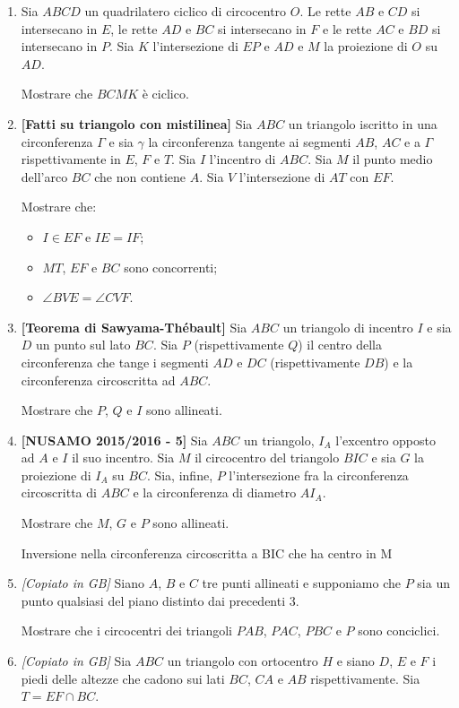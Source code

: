 \begin{enumerate}
	\item Sia $ABCD$ un quadrilatero ciclico di circocentro $O$. Le rette $AB$ e $CD$ si intersecano in $E$, le rette $AD$ e $BC$ si intersecano in $F$ e le rette $AC$ e $BD$ si intersecano in $P$. Sia $K$ l'intersezione di $EP$ e $AD$ e $M$ la proiezione di $O$ su $AD$.
	
	Mostrare che $BCMK$ è ciclico. 
	\item \textbf{[Fatti su triangolo con mistilinea]} Sia $ABC$ un triangolo iscritto in una circonferenza $\Gamma$ e sia $\gamma$ la circonferenza tangente ai segmenti $AB$, $AC$ e a $\Gamma$ rispettivamente in $E$, $F$ e $T$. Sia $I$ l'incentro di $ABC$. Sia $M$ il punto medio dell'arco $BC$ che non contiene $A$. Sia $V$ l'intersezione di $AT$ con $EF$. 
	
	Mostrare che:
	\begin{itemize}
		\item $I\in EF$ e $IE=IF$;
		\item $MT$, $EF$ e $BC$ sono concorrenti;
		\item $\angle BVE=\angle CVF$.
	\end{itemize}

	\item \textbf{[Teorema di Sawyama-Thébault]} 
	Sia $ABC$ un triangolo di incentro $I$ e sia $D$ un punto sul lato $BC$. Sia $P$ (rispettivamente $Q$) il centro della circonferenza che tange i segmenti $AD$ e $DC$ (rispettivamente $DB$) e la circonferenza circoscritta ad $ABC$. 
	
	Mostrare che $P$, $Q$ e $I$ sono allineati.
	\item \textbf{[NUSAMO 2015/2016 - 5]}
	Sia $ABC$ un triangolo, $I_A$ l'excentro opposto ad $A$
	e $I$ il suo incentro. Sia $M$ il circocentro del triangolo $BIC$ e sia $G$ la proiezione di $I_A$ su $BC$.
	Sia, infine, $P$ l'intersezione fra la circonferenza circoscritta di $ABC$ e la circonferenza di diametro $AI_A$. 
	
	Mostrare che $M$, $G$ e $P$ sono allineati.
	\begin{sol}
	Inversione nella circonferenza circoscritta a BIC che ha centro in M
    \end{sol}

	\item \emph{[Copiato in GB]} Siano $A$, $B$ e $C$ tre punti allineati e supponiamo che $P$ sia un punto qualsiasi del piano distinto dai precedenti 3. 
	
	Mostrare che i circocentri dei triangoli $PAB$, $PAC$, $PBC$ e $P$ sono conciclici.
	\item \emph{[Copiato in GB]} Sia $ABC$ un triangolo con ortocentro $H$ e siano $D$, $E$ e $F$ i piedi delle altezze che cadono sui lati $BC$, $CA$ e $AB$ rispettivamente. Sia $T=EF\cap BC$.
	

\end{enumerate}
